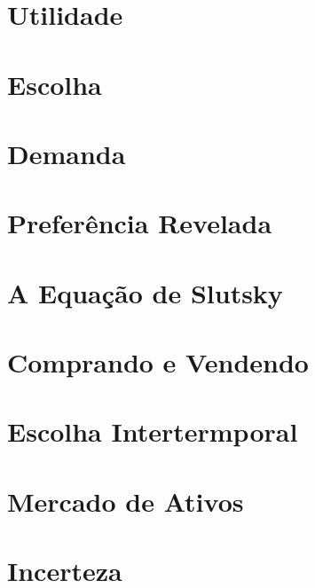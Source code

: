 \documentclass[a4paper,11pt,oneside]{book}
\theoremstyle{definition}
\theoremstyle{break}
\begin{document}
\chapter{Utilidade}

\chapter{Escolha}

\chapter{Demanda}

\chapter{Preferência Revelada}

\chapter{A Equação de Slutsky}

\chapter{Comprando e Vendendo}

\chapter{Escolha Intertermporal}

\chapter{Mercado de Ativos}

\chapter{Incerteza}

\end{document}
